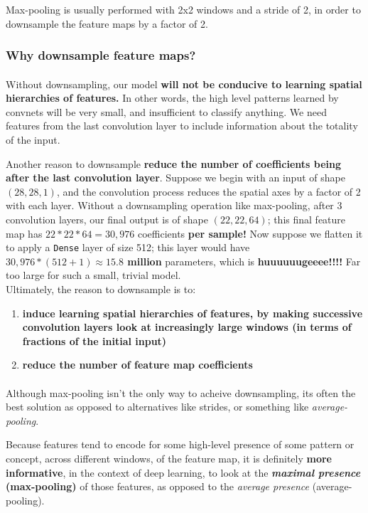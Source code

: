 \documentclass[12pt, a4paper]{article}
\begin{document}
Max-pooling is usually performed with 2x2 windows and a stride of 2, in order 
to downsample the feature maps by a factor of 2.

\subsubsection{Why downsample feature maps?}
\paragraph*{}
Without downsampling, our model \textbf{will not be conducive to learning 
spatial hierarchies of features.} In other words, the high level patterns learned 
by convnets will be very small, and insufficient to classify anything. We need features 
from the last convolution layer to include information about the totality of the input.

Another reason to downsample \textbf{reduce the number of coefficients being after the last 
convolution layer}. Suppose we begin with an input of shape $(28, 28, 1)$, and 
the convolution process reduces the spatial axes by a factor of 2 with each layer.
Without a downsampling operation like max-pooling, after 3 convolution layers, 
our final output is of shape $(22, 22, 64)$; this final feature map has 
\textbf{$22 * 22 * 64 = 30,976$} coefficients \textbf{per sample!}
Now suppose we flatten it to apply a \lstinline{Dense} layer of size 512; this layer 
would have \textbf{$30,976 * (512+1) \approx 15.8$ million} parameters, which is 
\textbf{huuuuuugeeee!!!!} Far too large for such a small, trivial model. \\

Ultimately, the reason to downsample is to:
\begin{enumerate}
   \item \textbf{induce learning spatial 
   hierarchies of features, by making successive convolution layers look at increasingly large windows 
   (in terms of fractions of the initial input)}

   \item \textbf{reduce the number of feature map coefficients}
\end{enumerate}


\paragraph*{}
Although max-pooling isn't the only way to acheive downsampling, its often 
the best solution as opposed to alternatives like strides, or something 
like \textit{average-pooling}.

Because features tend to encode for some high-level presence of some pattern or concept,
across different windows, of the feature map, it is definitely \textbf{more informative},
in the context of deep learning, to look at the \textbf{\textit{maximal presence} (max-pooling)}
of those features, as opposed to the \textit{average presence} (average-pooling).
\end{document}
